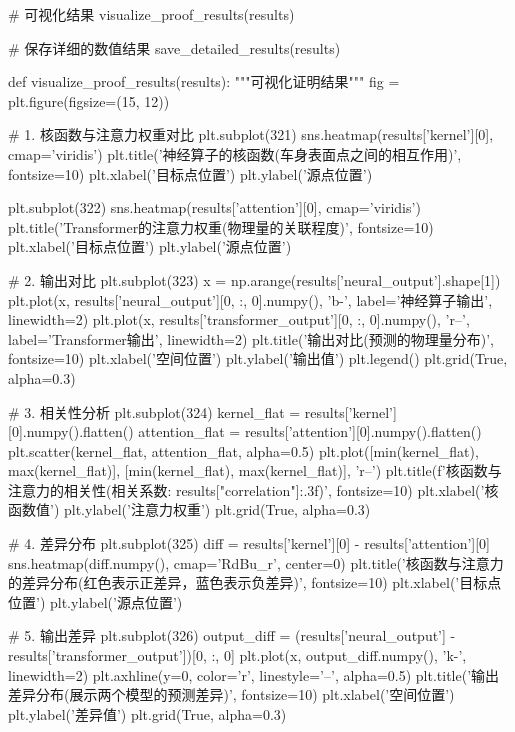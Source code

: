 \documentclass{MMCStyle}
\begin{document}
\begin{python}
    # 可视化结果
    visualize_proof_results(results)
    
    # 保存详细的数值结果
    save_detailed_results(results)

def visualize_proof_results(results):
    """可视化证明结果"""
    fig = plt.figure(figsize=(15, 12))
    
    # 1. 核函数与注意力权重对比
    plt.subplot(321)
    sns.heatmap(results['kernel'][0], cmap='viridis')
    plt.title('神经算子的核函数\n(车身表面点之间的相互作用)', fontsize=10)
    plt.xlabel('目标点位置')
    plt.ylabel('源点位置')
    
    plt.subplot(322)
    sns.heatmap(results['attention'][0], cmap='viridis')
    plt.title('Transformer的注意力权重\n(物理量的关联程度)', fontsize=10)
    plt.xlabel('目标点位置')
    plt.ylabel('源点位置')
    
    # 2. 输出对比
    plt.subplot(323)
    x = np.arange(results['neural_output'].shape[1])
    plt.plot(x, results['neural_output'][0, :, 0].numpy(), 'b-', 
             label='神经算子输出', linewidth=2)
    plt.plot(x, results['transformer_output'][0, :, 0].numpy(), 'r--',
             label='Transformer输出', linewidth=2)
    plt.title('输出对比\n(预测的物理量分布)', fontsize=10)
    plt.xlabel('空间位置')
    plt.ylabel('输出值')
    plt.legend()
    plt.grid(True, alpha=0.3)
    
    # 3. 相关性分析
    plt.subplot(324)
    kernel_flat = results['kernel'][0].numpy().flatten()
    attention_flat = results['attention'][0].numpy().flatten()
    plt.scatter(kernel_flat, attention_flat, alpha=0.5)
    plt.plot([min(kernel_flat), max(kernel_flat)],
             [min(kernel_flat), max(kernel_flat)], 'r--')
    plt.title(f'核函数与注意力的相关性\n(相关系数: {results["correlation"]:.3f})', 
              fontsize=10)
    plt.xlabel('核函数值')
    plt.ylabel('注意力权重')
    plt.grid(True, alpha=0.3)
    
    # 4. 差异分布
    plt.subplot(325)
    diff = results['kernel'][0] - results['attention'][0]
    sns.heatmap(diff.numpy(), cmap='RdBu_r', center=0)
    plt.title('核函数与注意力的差异分布\n(红色表示正差异，蓝色表示负差异)', fontsize=10)
    plt.xlabel('目标点位置')
    plt.ylabel('源点位置')
    
    # 5. 输出差异
    plt.subplot(326)
    output_diff = (results['neural_output'] - results['transformer_output'])[0, :, 0]
    plt.plot(x, output_diff.numpy(), 'k-', linewidth=2)
    plt.axhline(y=0, color='r', linestyle='--', alpha=0.5)
    plt.title('输出差异分布\n(展示两个模型的预测差异)', fontsize=10)
    plt.xlabel('空间位置')
    plt.ylabel('差异值')
    plt.grid(True, alpha=0.3)
    

\end{python}
\end{document}
